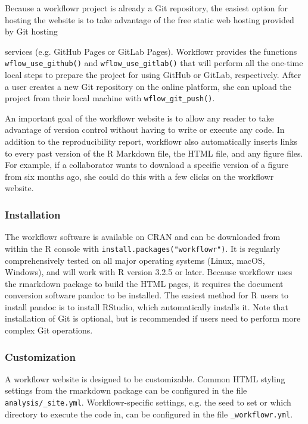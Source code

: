 \documentclass[9pt,a4paper]{extarticle}
\begin{document}
Because a workflowr project is already a Git repository, the easiest
option for hosting the website is to take advantage of the free static
web hosting provided by Git hosting

services (e.g. GitHub Pages or GitLab Pages). Workflowr provides the
functions \verb|wflow_use_github()| and \verb|wflow_use_gitlab()| that will perform
all the one-time local steps to prepare the project for using GitHub or
GitLab, respectively. After a user creates a new Git repository on the
online platform, she can upload the project from their local machine
with \verb|wflow_git_push()|.

An important goal of the workflowr website is to allow any reader to
take advantage of version control without having to write or execute any
code. In addition to the reproducibility report, workflowr also
automatically inserts links to every past version of the R Markdown
file, the HTML file, and any figure files. For example, if a
collaborator wants to download a specific version of a figure from six
months ago, she could do this with a few clicks on the workflowr
website.

\subsubsection*{Installation}

The workflowr software is available on CRAN and can be downloaded from
within the R console with \verb|install.packages("workflowr")|. It is
regularly comprehensively tested on all major operating systems (Linux,
macOS, Windows), and will work with R version 3.2.5 or later. Because
workflowr uses the rmarkdown package to build the HTML pages, it
requires the document conversion software pandoc to be installed. The
easiest method for R users to install pandoc is to install RStudio,
which automatically installs it. Note that installation of Git is
optional, but is recommended if users need to perform more complex Git
operations.

\subsubsection*{Customization}

A workflowr website is designed to be customizable. Common HTML styling
settings from the rmarkdown package can be configured in the file
\verb|analysis/_site.yml|. Workflowr-specific settings, e.g. the seed to
set or which directory to execute the code in, can be configured in the
file \verb|_workflowr.yml|.
\end{document}
